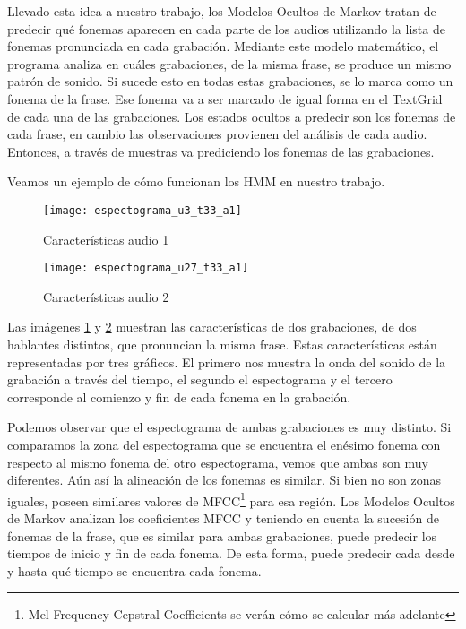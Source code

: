 Llevado esta idea a nuestro trabajo, los Modelos Ocultos de Markov tratan de predecir qué fonemas aparecen en cada parte de los audios utilizando la lista de fonemas pronunciada en cada grabación. Mediante este modelo matemático, el programa analiza en cuáles grabaciones, de la misma frase, se produce un mismo patrón de sonido. Si sucede esto en todas estas grabaciones, se lo marca como un fonema de la frase. Ese fonema va a ser marcado de igual forma en el TextGrid de cada una de las grabaciones. Los estados ocultos a predecir son los fonemas de cada frase, en cambio las observaciones provienen del análisis de cada audio. Entonces, a través de muestras va prediciendo los fonemas de las grabaciones.

Veamos un ejemplo de cómo funcionan los HMM en nuestro trabajo. 

\begin{figure}[H]
	\centering
	\texttt{[image: espectograma\_u3\_t33\_a1]} 
	\caption{Características audio 1}
	\label{car_a1}
\end{figure}

\begin{figure}[H]
	\centering
	\texttt{[image: espectograma\_u27\_t33\_a1]} 
	\caption{Características audio 2}
	\label{car_a2}
\end{figure}

Las imágenes \ref{car_a1} y \ref{car_a2} muestran las características de dos grabaciones, de dos hablantes distintos, que pronuncian la misma frase. Estas características están representadas por tres gráficos. El primero nos muestra la onda del sonido de la grabación a través del tiempo, el segundo el espectograma y el tercero corresponde al comienzo y fin de cada fonema en la grabación. 

Podemos observar que el espectograma de ambas grabaciones es muy distinto. Si comparamos la zona del espectograma que se encuentra el enésimo fonema con respecto al mismo fonema del otro espectograma, vemos que ambas son muy diferentes. Aún así la alineación de los fonemas es similar. Si bien no son zonas iguales, poseen similares valores de MFCC\footnote{Mel Frequency Cepstral Coefficients se verán cómo se calcular más adelante} para esa región. Los Modelos Ocultos de Markov analizan los coeficientes MFCC y teniendo en cuenta la sucesión de fonemas de la frase, que es similar para ambas grabaciones, puede predecir los tiempos de inicio y fin de cada fonema. De esta forma, puede predecir cada desde y hasta qué tiempo se encuentra cada fonema.
\\


